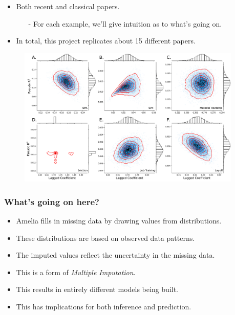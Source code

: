 \documentclass[12pt]{beamer}
\begin{document}
\begin{frame}
\begin{itemize}
\begin{itemize}
\begin{columns}
             \end{columns} 
             \vspace{.15in}
        \end{itemize}
    \item Both recent and classical papers.\vspace{.075in}
    \begin{itemize}
    \item[-] For each example, we'll give intuition as to what's going on.\vspace{.075in}
    \end{itemize}
    \item In total, this project replicates about 15 different papers.
\end{itemize}
\end{frame}

\begin{frame}
\begin{center}
\begin{figure}
	\includegraphics[width=0.95\textwidth]{figures/ffc_seeds.pdf}
\end{figure}
\end{center}
\end{frame}


\begin{frame}
\frametitle{What's going on here?}
\begin{itemize}
    \item Amelia fills in missing data by drawing values from distributions.\vspace{.1in}
    \item These distributions are based on observed data patterns.\vspace{.1in}
    \item The imputed values reflect the uncertainty in the missing data.\vspace{.1in}
	\item This is a form of \emph{Multiple Imputation}.\vspace{.1in}
	\item This results in entirely different models being built.\vspace{.1in}
	\item This has implications for both inference and prediction.\vspace{.1in}
\end{itemize}
\end{frame}
\end{document}
